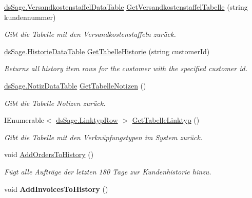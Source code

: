 \begin{DoxyCompactItemize}
\hyperlink{class_products_1_1_data_1_1ds_sage_1_1_versandkostenstaffel_data_table}{ds\+Sage.\+Versandkostenstaffel\+Data\+Table} \hyperlink{class_products_1_1_data_1_1_data_service_a89e75a4dd28595320d0d5c3f9aad7cc2}{Get\+Versandkostenstaffel\+Tabelle} (string kundennummer)
\begin{DoxyCompactList}\small\item\em Gibt die Tabelle mit den Versandkostenstaffeln zurück. \end{DoxyCompactList}\item 
\hyperlink{class_products_1_1_data_1_1ds_sage_1_1_historie_data_table}{ds\+Sage.\+Historie\+Data\+Table} \hyperlink{class_products_1_1_data_1_1_data_service_a53ebcc9f4eed2d8b3c3e968566bb2693}{Get\+Tabelle\+Historie} (string customer\+Id)
\begin{DoxyCompactList}\small\item\em Returns all history item rows for the customer with the specified customer id. \end{DoxyCompactList}\item 
\hyperlink{class_products_1_1_data_1_1ds_sage_1_1_notiz_data_table}{ds\+Sage.\+Notiz\+Data\+Table} \hyperlink{class_products_1_1_data_1_1_data_service_a9ef4ec359a2833b0231839c568422295}{Get\+Tabelle\+Notizen} ()
\begin{DoxyCompactList}\small\item\em Gibt die Tabelle Notizen zurück. \end{DoxyCompactList}\item 
I\+Enumerable$<$ \hyperlink{class_products_1_1_data_1_1ds_sage_1_1_linktyp_row}{ds\+Sage.\+Linktyp\+Row} $>$ \hyperlink{class_products_1_1_data_1_1_data_service_a202e8dc5482ce9468b2300a8deee0a98}{Get\+Tabelle\+Linktyp} ()
\begin{DoxyCompactList}\small\item\em Gibt die Tabelle mit den Verknüpfungstypen im System zurück. \end{DoxyCompactList}\item 
void \hyperlink{class_products_1_1_data_1_1_data_service_a721271a1927d0b08123dba3dd79dded3}{Add\+Orders\+To\+History} ()
\begin{DoxyCompactList}\small\item\em Fügt alle Aufträge der letzten 180 Tage zur Kundenhistorie hinzu. \end{DoxyCompactList}\item 
void {\bfseries Add\+Invoices\+To\+History} ()\hypertarget{class_products_1_1_data_1_1_data_service_abcb1691c07b73984d06f24f8b0e93d99}{}\label{class_products_1_1_data_1_1_data_service_abcb1691c07b73984d06f24f8b0e93d99}


\end{DoxyCompactItemize}
